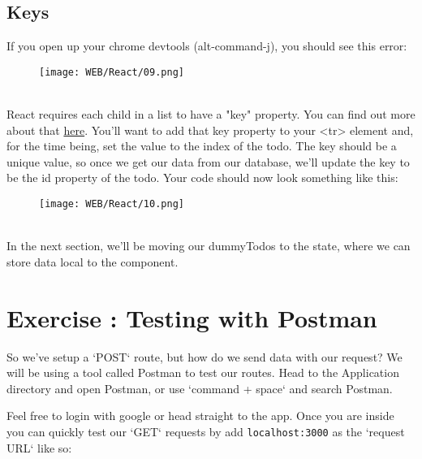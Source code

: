 \documentclass{42-en}
\begin{document}
\section{Keys}
If you open up your chrome devtools (alt-command-j), you should see this error:
\begin{figure}[H]
    \begin{center}
        \texttt{[image: WEB/React/09.png]}
    \end{center}
\end{figure}
~\\
React requires each child in a list to have a "key" property. You can find out more about that \href{https://reactjs.org/docs/lists-and-keys.html#keys}{here}. You’ll want to add that key property to your <tr> element and, for the time being, set the value to the index of the todo. The key should be a unique value, so once we get our data from our database, we’ll update the key to be the id property of the todo. Your code should now look something like this:
\begin{figure}[H]
    \begin{center}
        \texttt{[image: WEB/React/10.png]}
    \end{center}
\end{figure}
~\\
In the next section, we’ll be moving our dummyTodos to the state, where we can store data local to the component.
\nextexercice


\chapter{Exercise \exercicenumber: Testing with Postman}

    So we've setup a `POST` route, but how do we send data with our request? We will be using a tool called Postman to test our routes. Head to the Application directory and open Postman, or use  `command + space` and search Postman.

    Feel free to login with google or head straight to the app. Once you are inside you can quickly test our `GET` requests by add \texttt{localhost:3000} as the `request URL` like so:
\end{document}
